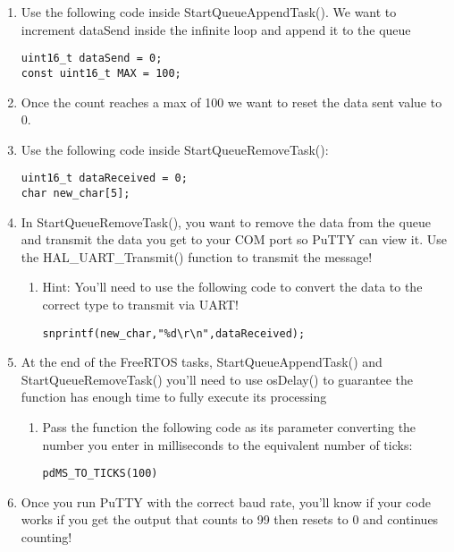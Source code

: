 \begin{enumerate}
    \item Use the following code inside StartQueueAppendTask(). We want to increment dataSend inside the infinite loop and append it to the queue
    \begin{lstlisting}[style=CStyle]
uint16_t dataSend = 0;
const uint16_t MAX = 100;
    \end{lstlisting}
    \item Once the count reaches a max of 100 we want to reset the data sent value to 0.
    \item Use the following code inside StartQueueRemoveTask():
    \begin{lstlisting}[style=CStyle]
uint16_t dataReceived = 0;
char new_char[5];
    \end{lstlisting}
    \item In StartQueueRemoveTask(), you want to remove the data from the queue and transmit the data you get to your COM port so PuTTY can view it. Use the HAL\_UART\_Transmit() function to transmit the message!
    \begin{enumerate}
        \item Hint: You'll need to use the following code to convert the data to the correct type to transmit via UART!
    \begin{lstlisting}[style=CStyle]
snprintf(new_char,"%d\r\n",dataReceived);
    \end{lstlisting}
    \end{enumerate}
    \item At the end of the FreeRTOS tasks, StartQueueAppendTask() and StartQueueRemoveTask() you'll need to use osDelay() to guarantee the function has enough time to fully execute its processing
    \begin{enumerate}
        \item Pass the function the following code as its parameter converting the number you enter in milliseconds to the equivalent number of ticks:
    \begin{lstlisting}[style=CStyle]
pdMS_TO_TICKS(100)
    \end{lstlisting}
    \end{enumerate}
    \item Once you run PuTTY with the correct baud rate, you'll know if your code works if you get the output that counts to 99 then resets to 0 and continues counting!
\end{enumerate}